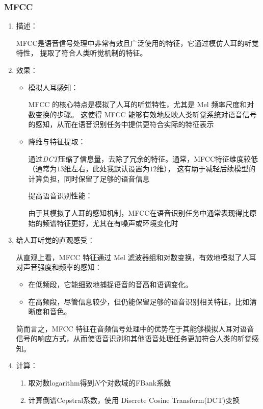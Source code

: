 \documentclass[a4paper]{article}
\begin{document}
\subsubsection{MFCC}
\begin{enumerate}
  \item 
  {
    描述：

    MFCC是语音信号处理中非常有效且广泛使用的特征，它通过模仿人耳的听觉特性，
    提取了符合人类听觉机制的特征。
  }
  \item 
  {
    效果：
    \begin{itemize}
      \item 模拟人耳感知：
      
      MFCC 的核心特点是模拟了人耳的听觉特性，尤其是 Mel 频率尺度和对数变换的步骤。
      这使得 MFCC 能够有效地反映人类听觉系统对语音信号的感知，从而在语音识别任务中提供更符合实际的特征表示

      \item 降维与特征提取：
      
      通过\emph{DCT}压缩了信息量，去除了冗余的特征。通常，MFCC特征维度较低（通常为$13$维左右，此处我默认设置为$12$维），
      这有助于减轻后续模型的计算负担，同时保留了足够的语音信息
      
      提高语音识别性能：
      
      由于其模拟了人耳的感知机制，MFCC在语音识别任务中通常表现得比原始的频谱特征更好，尤其在有噪声或环境变化时
    \end{itemize}
  }
  \item 
  {
    给人耳听觉的直观感受：

    从直观上看，MFCC 特征通过 Mel 滤波器组和对数变换，有效地模拟了人耳对声音强度和频率的感知：
    \begin{itemize}
      \item 在低频段，它能细致地捕捉语音的音高和语调变化。
      \item 在高频段，尽管信息较少，但仍能保留足够的语音识别相关特征，比如清晰度和音色。
    \end{itemize}
    
    简而言之，MFCC 特征在音频信号处理中的优势在于其能够模拟人耳对语音信号的响应方式，从而使语音识别和其他语音处理任务更加符合人类的听觉感知。
  }
  \item 
  {
    计算：

    \begin{enumerate}
      \item 取对数logarithm得到$N$个对数域的FBank系数
      \item 计算倒谱Cepstral系数，使用 Discrete Cosine Transform(DCT)变换
    \end{enumerate}

}
\end{enumerate}
\end{document}
